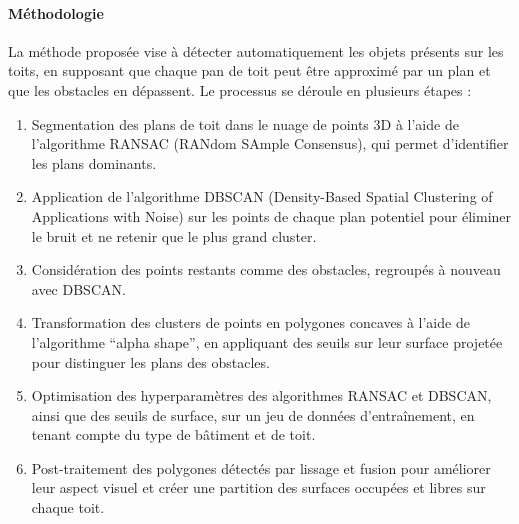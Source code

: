 {{{\paragraph{Méthodologie}
\par{La méthode proposée vise à détecter automatiquement les objets présents sur les toits, en supposant que chaque pan de toit peut être approximé par un plan et que les obstacles en dépassent. Le processus se déroule en plusieurs étapes :}
\begin{enumerate}
    \item Segmentation des plans de toit dans le nuage de points 3D à l'aide de l'algorithme RANSAC (RANdom SAmple Consensus), qui permet d'identifier les plans dominants.
    \item Application de l'algorithme DBSCAN (Density-Based Spatial Clustering of Applications with Noise) sur les points de chaque plan potentiel pour éliminer le bruit et ne retenir que le plus grand cluster.
    \item Considération des points restants comme des obstacles, regroupés à nouveau avec DBSCAN.
    \item Transformation des clusters de points en polygones concaves à l'aide de l'algorithme ``alpha shape'', en appliquant des seuils sur leur surface projetée pour distinguer les plans des obstacles.
    \item Optimisation des hyperparamètres des algorithmes RANSAC et DBSCAN, ainsi que des seuils de surface, sur un jeu de données d'entraînement, en tenant compte du type de bâtiment et de toit.
    \item Post-traitement des polygones détectés par lissage et fusion pour améliorer leur aspect visuel et créer une partition des surfaces occupées et libres sur chaque toit.
\end{enumerate}

\newpage
}}}
